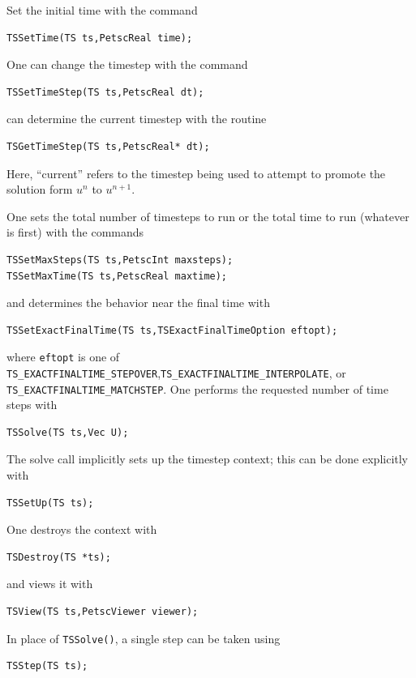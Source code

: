 \noindent Set the initial time with the command
\begin{lstlisting}
TSSetTime(TS ts,PetscReal time);
\end{lstlisting}
One can change the timestep with the command
\begin{lstlisting}
TSSetTimeStep(TS ts,PetscReal dt);
\end{lstlisting}
can determine the current timestep with the routine
\begin{lstlisting}
TSGetTimeStep(TS ts,PetscReal* dt);
\end{lstlisting}
Here, ``current'' refers to the timestep being used to attempt to
promote the solution form $ u^n $ to $ u^{n+1}. $

\noindent One sets the total number of timesteps to run or the total time to run
(whatever is first) with the commands
\begin{lstlisting}
TSSetMaxSteps(TS ts,PetscInt maxsteps);
TSSetMaxTime(TS ts,PetscReal maxtime);
\end{lstlisting}
and determines the behavior near the final time with
\begin{lstlisting}
TSSetExactFinalTime(TS ts,TSExactFinalTimeOption eftopt);
\end{lstlisting}
where \lstinline{eftopt} is one of \lstinline{TS_EXACTFINALTIME_STEPOVER},\lstinline{TS_EXACTFINALTIME_INTERPOLATE}, or\break
\lstinline{TS_EXACTFINALTIME_MATCHSTEP}.
One performs the requested number of time steps with
\begin{lstlisting}
TSSolve(TS ts,Vec U);
\end{lstlisting}
The solve call implicitly sets up the timestep context;
this can be done explicitly with
\begin{lstlisting}
TSSetUp(TS ts);
\end{lstlisting}
One destroys the context with
\begin{lstlisting}
TSDestroy(TS *ts);
\end{lstlisting}
and views it with
\begin{lstlisting}
TSView(TS ts,PetscViewer viewer);
\end{lstlisting}
In place of \lstinline{TSSolve()}, a single step can be taken using
\begin{lstlisting}
TSStep(TS ts);
\end{lstlisting}


